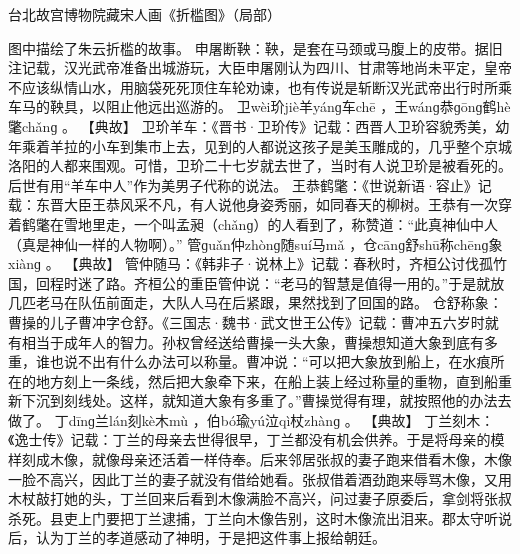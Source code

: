 \documentclass[12pt,UTF8]{ctexbook}
\begin{document}
台北故宫博物院藏宋人画《折槛图》（局部）

图中描绘了朱云折槛的故事。
申屠断鞅：鞅，是套在马颈或马腹上的皮带。据旧注记载，汉光武帝准备出城游玩，大臣申屠刚认为四川、甘肃等地尚未平定，皇帝不应该纵情山水，用脑袋死死顶住车轮劝谏，也有传说是斩断汉光武帝出行时所乘车马的鞅具，以阻止他远出巡游的。
卫wèi玠jiè羊yánɡ车chē
，王wánɡ恭ɡōnɡ鹤hè氅chǎnɡ
。
【典故】
卫玠羊车：《晋书·卫玠传》记载：西晋人卫玠容貌秀美，幼年乘着羊拉的小车到集市上去，见到的人都说这孩子是美玉雕成的，几乎整个京城洛阳的人都来围观。可惜，卫玠二十七岁就去世了，当时有人说卫玠是被看死的。后世有用“羊车中人”作为美男子代称的说法。
王恭鹤氅：《世说新语·容止》记载：东晋大臣王恭风采不凡，有人说他身姿秀丽，如同春天的柳树。王恭有一次穿着鹤氅在雪地里走，一个叫孟昶（chǎnɡ）的人看到了，称赞道：“此真神仙中人（真是神仙一样的人物啊）。”
管ɡuǎn仲zhònɡ随suí马mǎ
，仓cānɡ舒shū称chēnɡ象xiànɡ
。
【典故】
管仲随马：《韩非子·说林上》记载：春秋时，齐桓公讨伐孤竹国，回程时迷了路。齐桓公的重臣管仲说：“老马的智慧是值得一用的。”于是就放几匹老马在队伍前面走，大队人马在后紧跟，果然找到了回国的路。
仓舒称象：曹操的儿子曹冲字仓舒。《三国志·魏书·武文世王公传》记载：曹冲五六岁时就有相当于成年人的智力。孙权曾经送给曹操一头大象，曹操想知道大象到底有多重，谁也说不出有什么办法可以称量。曹冲说：“可以把大象放到船上，在水痕所在的地方刻上一条线，然后把大象牵下来，在船上装上经过称量的重物，直到船重新下沉到刻线处。这样，就知道大象有多重了。”曹操觉得有理，就按照他的办法去做了。
丁dīnɡ兰lán刻kè木mù
，伯bó瑜yú泣qì杖zhànɡ
。
【典故】
丁兰刻木：《逸士传》记载：丁兰的母亲去世得很早，丁兰都没有机会供养。于是将母亲的模样刻成木像，就像母亲还活着一样侍奉。后来邻居张叔的妻子跑来借看木像，木像一脸不高兴，因此丁兰的妻子就没有借给她看。张叔借着酒劲跑来辱骂木像，又用木杖敲打她的头，丁兰回来后看到木像满脸不高兴，问过妻子原委后，拿剑将张叔杀死。县吏上门要把丁兰逮捕，丁兰向木像告别，这时木像流出泪来。郡太守听说后，认为丁兰的孝道感动了神明，于是把这件事上报给朝廷。
\end{document}
